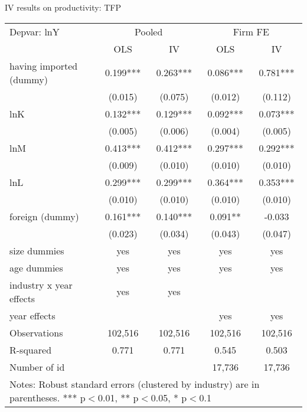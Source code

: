 \documentclass[10pt]{beamer}
\begin{document}
\begin{frame}{IV results on productivity: TFP}
\begin{table}
	\renewcommand{\baselinestretch}{1.2}  \scriptsize \centering
	\begin{tabular}{lcccc}
		\hline \hline
		Depvar: lnY & \multicolumn{2}{c}{Pooled} & \multicolumn{2}{c}{Firm FE} \\ 
		& OLS   & IV    & OLS   & IV \\ \hline
		having imported (dummy) & 0.199*** & 0.263*** & 0.086*** & 0.781*** \\
		& (0.015) & (0.075) & (0.012) & (0.112) \\
		lnK   & 0.132*** & 0.129*** & 0.092*** & 0.073*** \\
		& (0.005) & (0.006) & (0.004) & (0.005) \\
		lnM   & 0.413*** & 0.412*** & 0.297*** & 0.292*** \\
		& (0.009) & (0.010) & (0.010) & (0.010) \\
		lnL   & 0.299*** & 0.299*** & 0.364*** & 0.353*** \\
		& (0.010) & (0.010) & (0.010) & (0.010) \\
		foreign (dummy) & 0.161*** & 0.140*** & 0.091** & -0.033 \\
		& (0.023) & (0.034) & (0.043) & (0.047) \\
		size dummies & yes   & yes   & yes   & yes \\
		age dummies & yes   & yes   & yes   & yes \\
		industry x year effects & yes   & yes   &       &  \\
		year effects &       &       & yes   & yes \\
		Observations & 102,516 & 102,516 & 102,516 & 102,516 \\
		R-squared & 0.771 & 0.771 & 0.545 & 0.503 \\
		Number of id &       &       & 17,736 & 17,736 \\
	\hline \hline
\multicolumn{5}{l}{%
	\begin{minipage}{8cm}
		\scriptsize Notes: Robust standard errors (clustered by industry) are in parentheses. *** p$<$0.01, ** p$<$0.05, * p$<$0.1%
	\end{minipage}%
}\\
\end{tabular}%
\renewcommand{\baselinestretch}{1.62}\normalsize \setlength{\baselineskip}{0.65\baselineskip}
\end{table}
\end{frame}
\end{document}
